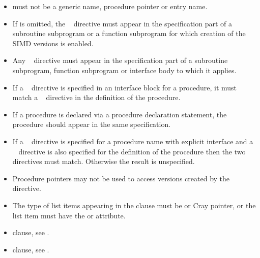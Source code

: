 \begin{itemize}
\fortranspecificstart
\item {} must not be a generic name, procedure pointer or entry name.

\item If  is omitted, the ~
  directive must appear in the specification part of a subroutine
  subprogram or a function subprogram for which creation of the SIMD
  versions is enabled.

\item Any ~ directive must appear in the specification part of a subroutine 
subprogram, function subprogram or interface body to which it applies.

\item If a ~ directive is specified in an interface block for a procedure, it 
must match a ~ directive in the definition of the procedure.

\item If a procedure is declared via a procedure declaration statement, the procedure 
 should appear in the same specification. 

\item If a ~ directive is specified for a procedure name with explicit 
interface and a ~ directive is also specified for the definition of the 
procedure then the two ~ directives must match. Otherwise the result 
is unspecified.

\item Procedure pointers may not be used to access versions created by the ~ directive.

\item The type of list items appearing in the  clause must be  or Cray 
pointer, or the list item must have the  or  attribute.
\fortranspecificend
\end{itemize}

\crossreferences
\begin{itemize}
\item {} clause, see 
.

\item {} clause, see 
.
\end{itemize}










